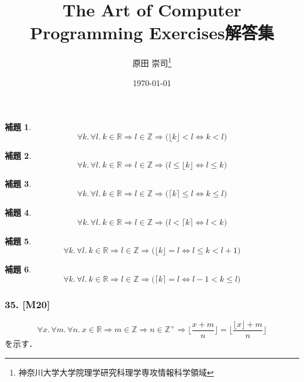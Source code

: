 \documentclass[11pt,dvipdfmx]{jarticle}
\title{The Art of Computer Programming Exercises解答集}
\author{原田 崇司\thanks{神奈川大学大学院理学研究科理学専攻情報科学領域}}
\date{\today}
\theoremstyle{definition}
\newtheorem{lemma}{補題}[section]
\begin{document}
\maketitle
\thispagestyle{empty}

\setcounter{section}{1}
\setcounter{subsection}{2}


\setcounter{subsubsection}{3}

\begin{lemma}
 \[
  \forall k. \, \forall l. \ k \in \mathbb{R} \Rightarrow l \in \mathbb{Z} \Rightarrow \biggl( \lfloor k \rfloor < l \iff k < l \biggr)
 \]
 \label{lemma:p41a}
\end{lemma}

\begin{lemma}
 \[
  \forall k. \, \forall l. \ k \in \mathbb{R} \Rightarrow l \in \mathbb{Z} \Rightarrow \biggl( l \leq \lfloor k \rfloor \iff l \leq k \biggr)
 \]
 \label{lemma:p41b}
\end{lemma}

\begin{lemma}
 \[
  \forall k. \, \forall l. \ k \in \mathbb{R} \Rightarrow l \in \mathbb{Z} \Rightarrow \biggl( \lceil k \rceil \leq l \iff k \leq l \biggr)
 \]
 \label{lemma:p41c}
\end{lemma}

\begin{lemma}
 \[
  \forall k. \, \forall l. \ k \in \mathbb{R} \Rightarrow l \in \mathbb{Z} \Rightarrow \biggl( l < \lceil k \rceil \iff l < k \biggr)
 \]
 \label{lemma:p41d}
\end{lemma}

\begin{lemma}
 \[
  \forall k. \, \forall l. \ k \in \mathbb{R} \Rightarrow l \in \mathbb{Z} \Rightarrow \biggl( \lfloor k \rfloor = l \iff l \leq k < l+1\biggr)
 \]
 \label{lemma:p41e}
\end{lemma}

\begin{lemma}
 \[
  \forall k. \, \forall l. \ k \in \mathbb{R} \Rightarrow l \in \mathbb{Z} \Rightarrow \biggl( \lceil k \rceil = l \iff l-1 < k \leq l \biggr)
 \]
 \label{lemma:p41f}
\end{lemma}



\subsubsection{35. [M20]}
\begin{equation}
\forall x. \, \forall m. \, \forall n. \  x \in \mathbb{R} \Rightarrow m \in \mathbb{Z} \Rightarrow n \in \mathbb{Z}^{+} \Rightarrow \lfloor \frac{x+m}{n} \rfloor =  \lfloor \frac{ \lfloor x \rfloor +m}{n} \rfloor
 \label{eq:1_2_4_35_goal}
\end{equation}
を示す．
\end{document}
